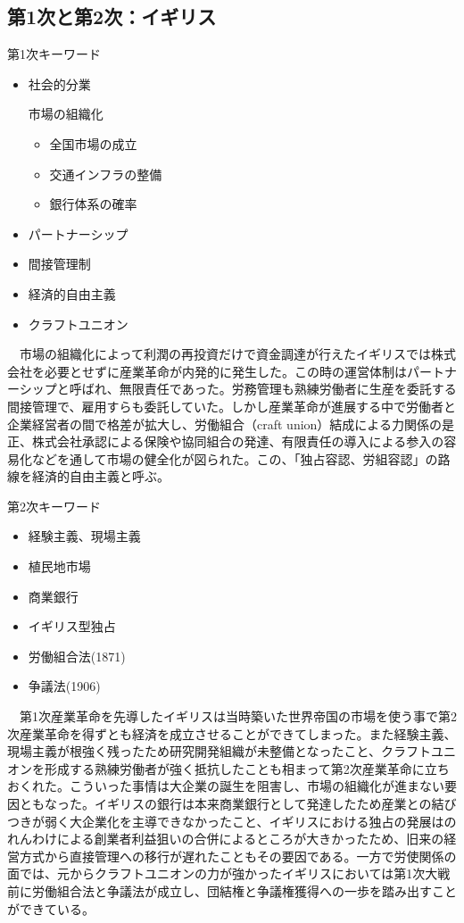 \documentclass{jsarticle}
\begin{document}
\subsection{第1次と第2次：イギリス}
第1次キーワード
\begin{itemize}
\item 社会的分業

市場の組織化
	\begin{itemize}
	\item 全国市場の成立
	\item 交通インフラの整備
	\item 銀行体系の確率
	\end{itemize}
\item パートナーシップ
\item 間接管理制
\item 経済的自由主義
\item クラフトユニオン
\end{itemize}
　市場の組織化によって利潤の再投資だけで資金調達が行えたイギリスでは株式会社を必要とせずに産業革命が内発的に発生した。この時の運営体制はパートナーシップと呼ばれ、無限責任であった。労務管理も熟練労働者に生産を委託する間接管理で、雇用すらも委託していた。しかし産業革命が進展する中で労働者と企業経営者の間で格差が拡大し、労働組合（craft union）結成による力関係の是正、株式会社承認による保険や協同組合の発達、有限責任の導入による参入の容易化などを通して市場の健全化が図られた。この、「独占容認、労組容認」の路線を経済的自由主義と呼ぶ。

第2次キーワード
\begin{itemize}
\item 経験主義、現場主義
\item 植民地市場
\item 商業銀行
\item イギリス型独占
\item 労働組合法(1871)
\item 争議法(1906)
\end{itemize}
　第1次産業革命を先導したイギリスは当時築いた世界帝国の市場を使う事で第2次産業革命を得ずとも経済を成立させることができてしまった。また経験主義、現場主義が根強く残ったため研究開発組織が未整備となったこと、クラフトユニオンを形成する熟練労働者が強く抵抗したことも相まって第2次産業革命に立ちおくれた。こういった事情は大企業の誕生を阻害し、市場の組織化が進まない要因ともなった。イギリスの銀行は本来商業銀行として発達したため産業との結びつきが弱く大企業化を主導できなかったこと、イギリスにおける独占の発展はのれんわけによる創業者利益狙いの合併によるところが大きかったため、旧来の経営方式から直接管理への移行が遅れたこともその要因である。一方で労使関係の面では、元からクラフトユニオンの力が強かったイギリスにおいては第1次大戦前に労働組合法と争議法が成立し、団結権と争議権獲得への一歩を踏み出すことができている。
\end{document}
